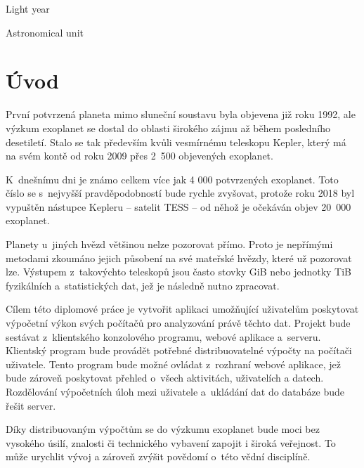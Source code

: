 \documentclass[a4paper,12pt]{article}
\begin{document}
\deskpage
\mainpage
\assignment
\statement
\acknowledgment
\annotationcs	
\annotationen
\content
\imglist
\tablelist
\codelist
\formulalist
\shortlist

\begin{description}[font=\mdseries,leftmargin=6em,labelwidth=!,]
\item[ly]		Light year
\item[au]		Astronomical unit
\end{description}

\clearpage\pagestyle{plain}
\section*{Úvod}
\label{uvod}

První potvrzená planeta mimo sluneční soustavu byla objevena již roku 1992, ale výzkum exoplanet se dostal do oblasti širokého zájmu až během posledního desetiletí. Stalo se tak především kvůli vesmírnému teleskopu Kepler, který má na svém kontě od roku 2009 přes 2~500 objevených exoplanet.

K~dnešnímu dni je známo celkem více jak 4 000 potvrzených exoplanet. Toto číslo se s~nejvyšší pravděpodobností bude rychle zvyšovat, protože roku 2018 byl vypuštěn nástupce Kepleru -- satelit TESS -- od něhož je očekáván objev 20~000 exoplanet.

Planety u~jiných hvězd většinou nelze pozorovat přímo. Proto je nepřímými metodami zkoumáno jejich působení na své mateřské hvězdy, které už pozorovat lze. Výstupem z~takovýchto teleskopů jsou často stovky GiB nebo jednotky TiB fyzikálních a~statistických dat, jež je následně nutno zpracovat.

Cílem této diplomové práce je vytvořit aplikaci umožňující uživatelům poskytovat výpočetní výkon svých počítačů pro analyzování právě těchto dat. Projekt bude sestávat z~klientského konzolového programu, webové aplikace a~serveru. Klientský program bude provádět potřebné distribuovatelné výpočty na počítači uživatele. Tento program bude možné ovládat z~rozhraní webové aplikace, jež bude zároveň poskytovat přehled o~všech aktivitách, uživatelích a datech. Rozdělování výpočetních úloh mezi uživatele a~ukládání dat do databáze bude řešit server.

Díky distribuovaným výpočtům se do výzkumu exoplanet bude moci bez vysokého úsilí, znalosti či technického vybavení zapojit i široká veřejnost. To může urychlit vývoj a zároveň zvýšit povědomí o~této vědní disciplíně.
\end{document}
